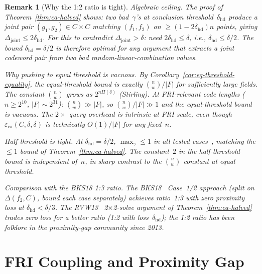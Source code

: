 \documentclass[11pt]{article}
\newtheorem{remark}[theorem]{Remark}
\begin{document}
\begin{remark}[Why the 1:2 ratio is tight]
\label{rem:barrier}
\emph{Algebraic ceiling.} The proof of Theorem~\ref{thm:ca-halved} shows: two bad~$\gamma$'s at conclusion threshold~$\delta_{\mathrm{hd}}$ produce a joint pair $(g_1, g_2) \in C \times C$ matching $(f_1, f_2)$ on $\geq (1 - 2\delta_{\mathrm{hd}})n$ points, giving $\Delta_{\mathrm{joint}} \leq 2\delta_{\mathrm{hd}}$. For this to contradict $\Delta_{\mathrm{joint}} > \delta$: need $2\delta_{\mathrm{hd}} \leq \delta$, i.e., $\delta_{\mathrm{hd}} \leq \delta/2$. The bound $\delta_{\mathrm{hd}} = \delta/2$ is therefore \emph{optimal} for any argument that extracts a joint codeword pair from two bad random-linear-combination values.

\emph{Why pushing to equal threshold is vacuous.} By Corollary~\ref{cor:eq-threshold-equality}, the equal-threshold bound is exactly $\binom{n}{w}/|F|$ for sufficiently large fields. The constant $\binom{n}{w}$ grows as $2^{nH(\delta)}$ (Stirling). At FRI-relevant code lengths ($n \geq 2^{10}$, $|F| {\sim} 2^{31}$): $\binom{n}{w} \gg |F|$, so $\binom{n}{w}/|F| \gg 1$ and the equal-threshold bound is vacuous. The $2\times$ query overhead is intrinsic at FRI scale, even though $\varepsilon_{\mathrm{ca}}(C,\delta,\delta)$ is technically $O(1)/|F|$ for any fixed~$n$.

\emph{Half-threshold is tight.} At $\delta_{\mathrm{hd}} = \delta/2$, $\max_\gamma \leq 1$ in all tested cases~\cite{CompanionRepo}, matching the $\leq 1$ bound of Theorem~\ref{thm:ca-halved}. The constant~$2$ in the half-threshold bound is \emph{independent of~$n$}, in sharp contrast to the $\binom{n}{w}$ constant at equal threshold.

\emph{Comparison with the BKS18 1:3 ratio.} The BKS18~\cite{BKS} \emph{Case~1/2} approach (split on $\Delta(f_2, C)$, bound each case separately) achieves ratio~1:3 with \emph{zero} proximity loss at $\delta_{\mathrm{hd}} < \delta/3$. The RVW13~\cite{RVW} 2$\times$2-solve argument of Theorem~\ref{thm:ca-halved} trades zero loss for a better ratio (1:2 with loss~$\delta_{\mathrm{hd}}$); the 1:2 ratio has been folklore in the proximity-gap community since 2013.
\end{remark}


\section{FRI Coupling and Proximity Gap}
\label{sec:fri}
\end{document}
